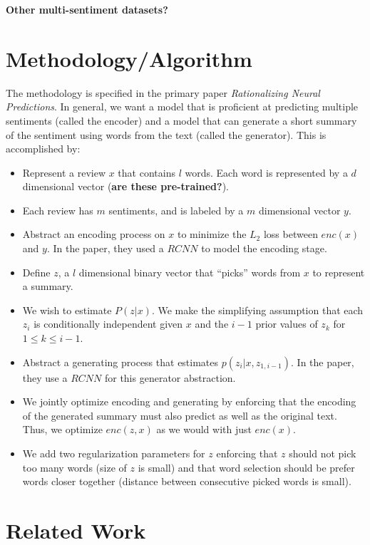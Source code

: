\documentclass{article}
\begin{document}
\textbf{Other multi-sentiment datasets?}

\section*{Methodology/Algorithm}

The methodology is specified in the primary paper \textit{Rationalizing Neural
Predictions}. In general, we want a model that is proficient at predicting
multiple sentiments (called the encoder) and a model that can generate a short
summary of the sentiment using words from the text (called the generator). This is accomplished by:

\begin{itemize}
	\item Represent a review $x$ that contains $l$ words. Each word is 
	represented by a $d$ dimensional vector (\textbf{are these pre-trained?}).
	\item Each review has $m$ sentiments, and is labeled by a $m$ dimensional 
	vector $y$.
	\item Abstract an encoding process on $x$ to minimize the $L_{2}$ loss 
	between $enc(x)$ and $y$. In the paper, they used a $RCNN$ to model the 
	encoding stage.
	\item Define $z$, a $l$ dimensional binary vector that ``picks'' words from 
	$x$ to represent a summary.
	\item We wish to estimate $P(z | x)$. We make the simplifying assumption 
	that each $z_{i}$ is conditionally independent given $x$ and the $i - 1$ 
	prior values of $z_{k}$ for $1 \le k \le i - 1$.
	\item Abstract a generating process that estimates 
	$p(z_{i} | x, z_{1, i - 1})$. In the paper, they use a $RCNN$ for this 
	generator abstraction.
	\item We jointly optimize encoding and generating by enforcing that the 
	encoding of the generated summary must also predict as well as the original 
	text. Thus, we optimize $enc(z, x)$ as we would with just $enc(x)$.
	\item We add two regularization parameters for $z$ enforcing that $z$ should 
	not pick too many words (size of $z$ is small) and that word selection 
	should be prefer words closer together (distance between consecutive picked 
	words is small).
\end{itemize}

\section*{Related Work}
\end{document}
